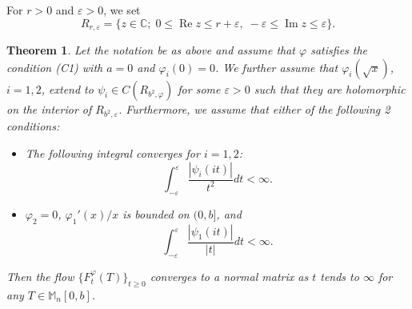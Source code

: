 \documentclass[12pt]{article}
\newtheorem{theorem}{Theorem}[section]
\theoremstyle{definition}
\numberwithin{equation}{section}
\newcommand{\C}{\mathbb{C}}
\newcommand{\M}{\mathbb{M}}
\renewcommand{\Re}{\operatorname{Re}}
\renewcommand{\Im}{\operatorname{Im}}
\begin{document}
For $r>0$ and $\varepsilon>0$, we set 
\[R_{r,\varepsilon}=\{z\in \C;\; 0\leq \Re z\leq r+\varepsilon,\; -\varepsilon \leq \Im z\leq \varepsilon\}.\]

\begin{theorem}\label{holomorphic} Let the notation be as above and assume that $\varphi$ satisfies the condition (C1) 
with $a=0$ and $\varphi_i(0)=0$. 
We further assume that $\varphi_i(\sqrt{x})$, $i=1,2$, 
extend to $\psi_i\in C(R_{b^2,\varphi})$ for some $\varepsilon>0$ such that they are holomorphic 
on the interior of $R_{b^2,\varepsilon}$.  
Furthermore, we assume that either of the following 2 conditions: 
\begin{itemize}
\item[$(1)$] The following integral converges for $i=1,2$: 
\[\int_{-\varepsilon}^{\varepsilon}\frac{|\psi_i(it)|}{t^2}dt<\infty.\] 
\item[$(2)$] $\varphi_2=0$, $\varphi_1'(x)/x$ is bounded on $(0,b]$, and 
\[\int_{-\varepsilon}^{\varepsilon}\frac{|\psi_1(it)|}{|t|}dt<\infty.\] 
\end{itemize}
Then the flow $\{F^\varphi_t(T)\}_{t\geq 0}$ converges to a normal matrix 
as $t$ tends to $\infty$ for any $T\in \M_n[0,b]$.  
\end{theorem}
\end{document}
